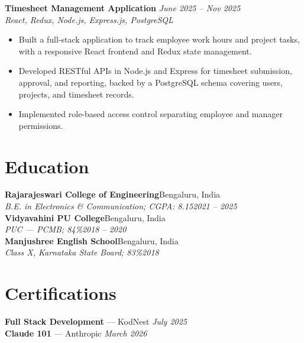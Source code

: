 \documentclass[a4paper,10pt]{article}
\newcommand{\heading}[2]{\textbf{#1}\hfill #2\\[1pt]}
\newcommand{\subheading}[2]{\textit{#1}\hfill \textit{#2}\\[1pt]}
\begin{document}
\vspace{5pt}
\textbf{Timesheet Management Application} \hfill \textit{June 2025 -- Nov 2025}\\[1pt]
\textit{React, Redux, Node.js, Express.js, PostgreSQL}
\begin{itemize}
  \item Built a full-stack application to track employee work hours and project tasks, with a
        responsive React frontend and Redux state management.
  \item Developed RESTful APIs in Node.js and Express for timesheet submission, approval, and
        reporting, backed by a PostgreSQL schema covering users, projects, and timesheet records.
  \item Implemented role-based access control separating employee and manager permissions.
\end{itemize}

\section{Education}
\heading{Rajarajeswari College of Engineering}{Bengaluru, India}
\subheading{B.E. in Electronics \& Communication; CGPA: 8.15}{2021 -- 2025}
\vspace{3pt}
\heading{Vidyavahini PU College}{Bengaluru, India}
\subheading{PUC --- PCMB; 84\%}{2018 -- 2020}
\vspace{3pt}
\heading{Manjushree English School}{Bengaluru, India}
\subheading{Class X, Karnataka State Board; 83\%}{2018}

\section{Certifications}
\textbf{Full Stack Development} --- KodNest \hfill \textit{July 2025}\\[2pt]
\textbf{Claude 101} --- Anthropic \hfill \textit{March 2026}
\end{document}
